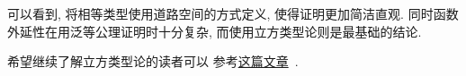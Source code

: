可以看到, 将相等类型使用道路空间的方式定义, 使得证明更加简洁直观.
同时函数外延性在用泛等公理证明时十分复杂, 而使用立方类型论则是最基础的结论.


希望继续了解立方类型论的读者可以
参考\href{https://1lab.dev/1Lab.intro.html}{这篇文章}~\cite{amelia:2023:1lab}.
